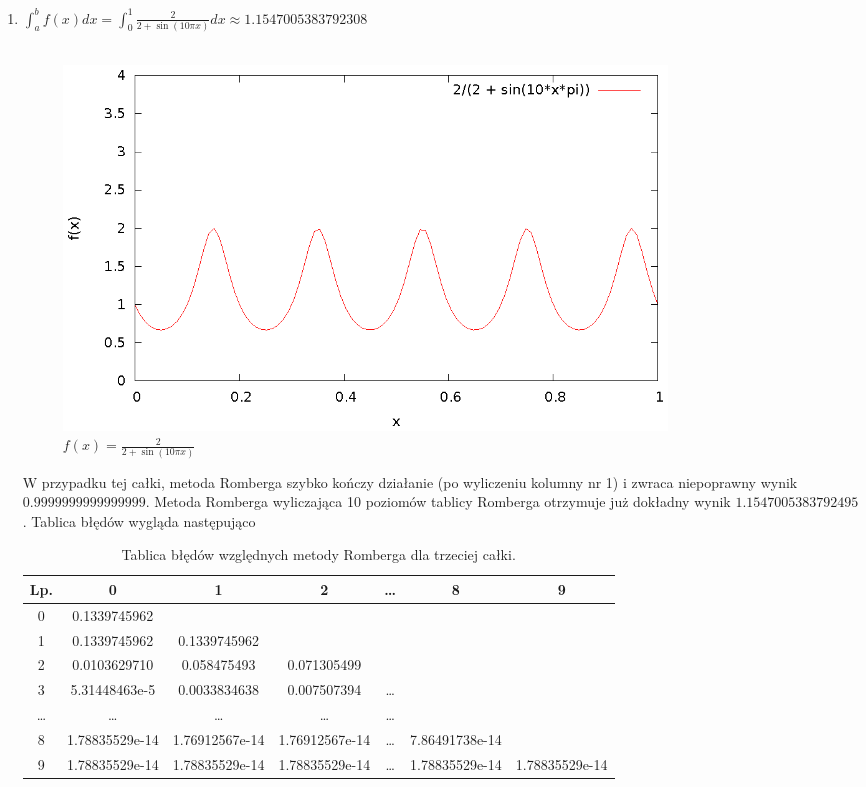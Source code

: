\documentclass{article}
\begin{document}
\begin{enumerate}
	\item $\int_a^b f(x) dx = \int_0^1 \frac{2}{2 + \sin(10 \pi x)} dx \approx 1.1547005383792308$ \\ \\
	\begin{figure}[H]
		\centering
		\includegraphics[width=0.8\textwidth]{wykresy/3.eps}
		\caption{$f(x) = \frac{2}{2 + \sin(10 \pi x)}$}
	\end{figure}
	W przypadku tej całki, metoda Romberga szybko kończy działanie (po wyliczeniu
	kolumny nr 1) i zwraca niepoprawny wynik $0.9999999999999999$.
	Metoda Romberga wyliczająca 10 poziomów tablicy Romberga otrzymuje już dokładny wynik $1.1547005383792495$.
	Tablica błędów wygląda następująco

	\begin{table}[h]
	\centering
	\begin{tabular}[c]{|c|c|c|c|c|c|c|}
	\hline
	Lp. & 0 & 1 & 2 & \ldots & 8 & 9 \\
	\hline
	0 & 0.1339745962 & & & & &\\
	1 & 0.1339745962 & 0.1339745962 & & & & \\
	2 & 0.0103629710 & 0.058475493 & 0.071305499 & & & \\
	3 & 5.31448463e-5 & 0.0033834638 & 0.007507394 & \dots & & \\
	\dots & \dots & \dots & \dots & \dots & & \\
	8 & 1.78835529e-14 & 1.76912567e-14 & 1.76912567e-14 & \dots & 7.86491738e-14 & \\
	9 & 1.78835529e-14 & 1.78835529e-14 & 1.78835529e-14 & \dots & 1.78835529e-14 & 1.78835529e-14 \\
	\hline
	\end{tabular}
	\caption{Tablica błędów względnych metody Romberga dla trzeciej całki.}
	\end{table}


\end{enumerate}
\end{document}
